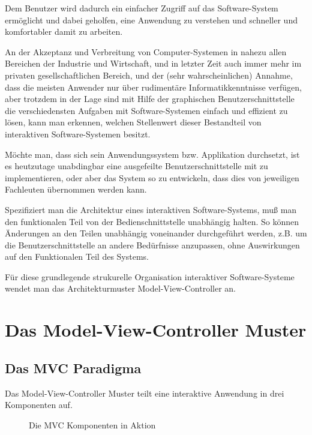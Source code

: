 \documentclass[11pt,a4paper,titlepage]{scrreprt}
\begin{document}
Dem Benutzer wird dadurch ein einfacher Zugriff auf das Software-System ermöglicht und
dabei geholfen, eine Anwendung zu verstehen und schneller und komfortabler damit zu arbeiten.

An der Akzeptanz und Verbreitung von Computer-Systemen in nahezu allen Bereichen der Industrie
und Wirtschaft, und in letzter Zeit auch immer mehr im privaten gesellschaftlichen Bereich, und
der (sehr wahrscheinlichen) Annahme, dass die meisten Anwender nur über rudimentäre
Informatikkenntnisse verfügen, aber trotzdem in der Lage sind mit Hilfe der graphischen
Benutzerschnittstelle die verschiedensten Aufgaben mit Software-Systemen einfach und effizient
zu lösen, kann man erkennen, welchen Stellenwert dieser Bestandteil von interaktiven
Software-Systemen besitzt.

Möchte man, dass sich sein Anwendungssystem bzw. Applikation durchsetzt, ist es heutzutage
unabdingbar eine ausgefeilte Benutzerschnittstelle mit zu implementieren, oder aber 
das System so zu entwickeln, dass dies von jeweiligen Fachleuten übernommen werden kann.

Spezifiziert man die Architektur eines interaktiven Software-Systems, muß man den funktionalen
Teil von der Bedienschnittstelle unabhängig halten. So können Änderungen an den Teilen
unabhängig voneinander durchgeführt werden, z.B. um die Benutzerschnittstelle an andere
Bedürfnisse anzupassen, ohne Auswirkungen auf den Funktionalen Teil des Systems.

Für diese grundlegende strukurelle Organisation interaktiver Software-Systeme wendet man
das Architekturmuster Model-View-Controller an.

\chapter{Das Model-View-Controller Muster}
\section{Das MVC Paradigma}
Das Model-View-Controller Muster teilt eine interaktive Anwendung in drei Komponenten auf.

\begin{figure}[h]
\caption{Die MVC Komponenten in Aktion}
\end{figure}
\end{document}

